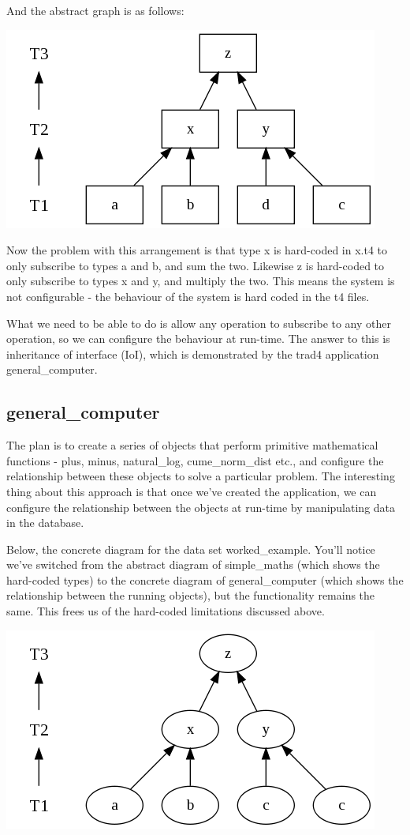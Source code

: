 \documentclass{report}
\begin{document}
And the abstract graph is as follows:

\includegraphics[scale=0.5]{simplemathsabstract.png}

Now the problem with this arrangement is that type x is hard-coded in x.t4 to only subscribe to types a and b, and sum the two. Likewise z is hard-coded to only subscribe to types x and y, and multiply the two. This means the system is not configurable - the behaviour of the system is hard coded in the t4 files.

What we need to be able to do is allow any operation to subscribe to any other operation, so we can configure the behaviour at run-time. The answer to this is inheritance of interface (IoI), which is demonstrated by the trad4 application general_computer.

\subsection{general_computer}

The plan is to create a series of objects that perform primitive mathematical functions - plus, minus, natural_log, cume_norm_dist etc., and configure the relationship between these objects to solve a particular problem. The interesting thing about this approach is that once we've created the application, we can configure the relationship between the objects at run-time by manipulating data in the database. 

Below, the concrete diagram for the data set worked_example. You'll notice we've switched from the abstract diagram of simple_maths (which shows the hard-coded types) to the concrete diagram of general_computer (which shows the relationship between the running objects), but the functionality remains the same. This frees us of the hard-coded limitations discussed above.

\includegraphics[scale=0.5]{generalcomputerworkedexample.png}
\end{document}
